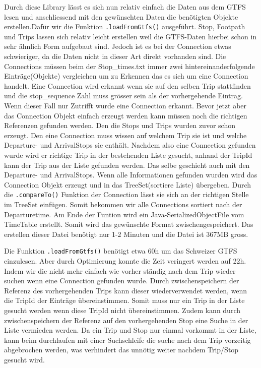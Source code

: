 Durch diese Library lässt es sich nun relativ einfach die Daten aus dem GTFS lesen und anschliessend mit den gewünschten Daten die benötigten Objekte erstellen.Dafür wir die Funktion \texttt{.loadFromGtfs()} ausgeführt.  Stop, Footpath und Trips lassen sich relativ leicht erstellen weil die GTFS-Daten hierbei schon in sehr ähnlich Form aufgebaut sind. Jedoch ist es bei der Connection etwas schwieriger, da die Daten nicht in dieser Art direkt vorhanden sind. Die Connections müssen beim der Stop\_times.txt immer zwei hintereinanderfolgende Einträge(Objekte) vergleichen um zu Erkennen das es sich um eine Connection handelt. Eine Connection wird erkannt wenn sie auf den selben Trip stattfinden und die stop\_sequence Zahl muss grösser sein als der vorhergehende Eintrag. Wenn dieser Fall nur Zutrifft wurde eine Connection erkannt. Bevor jetzt aber das Connection Objekt einfach erzeugt werden kann müssen noch die richtigen Referenzen gefunden werden. Den die Stops und Trips wurden zuvor schon erzeugt. Den eine Connection muss wissen auf welchem Trip sie ist und welche Departure- und ArrivalStops sie enthält. Nachdem also eine Connection gefunden wurde wird er richtige Trip in der bestehenden Liste gesucht, anhand der TripId kann der Trip aus der Liste gefunden werden. Das selbe geschieht auch mit den Departure- und ArrivalStops. Wenn alle Informationen gefunden wurden wird das Connection Objekt erzeugt und in das TreeSet(sortiere Liste) übergeben. Durch die \texttt{.compareTo()} Funktion der Connection lässt sie sich an der richtigen Stelle im TreeSet einfügen. Somit bekommen wir alle Connections sortiert nach der Departuretime. Am Ende der Funtion wird ein Java-SerializedObjectFile vom TimeTable erstellt. Somit wird das gewünschte Format zwischengespeichert. Das erstellen dieser Datei benötigt nur 1-2 Minuten und die Datei ist 367MB gross.\newline

Die Funktion \texttt{.loadFromGtfs()} benötigt etwa 60h um das Schweizer GTFS einzulesen. Aber durch Optimierung konnte die Zeit veringert werden auf 22h. Indem wir die nicht mehr einfach wie vorher ständig nach dem Trip wieder suchen wenn eine Connection gefunden wurde. Durch zwischenspeichern der Referenz des vorhergehenden Trips kann dieser wiederverwendet werden, wenn die TripId der Einträge übereinstimmen. Somit muss nur ein Trip in der Liste gesucht werden wenn diese TripId nicht übereinstimmen. Zudem kann durch zwischenspeichern der Referenz auf den vorhergehenden Stop eine Suche in der Liste vermieden werden. Da ein Trip und Stop nur einmal vorkommt in der Liste, kann beim durchlaufen mit einer Suchschleife die suche nach dem Trip vorzeitig abgebrochen werden, was verhindert das unnötig weiter nachdem Trip/Stop gesucht wird.  

